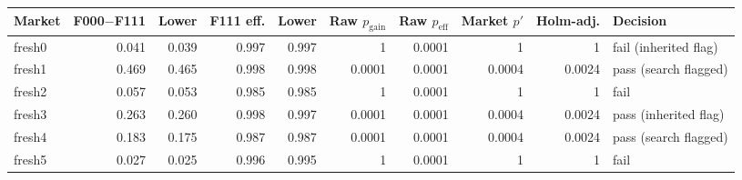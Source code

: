 \begin{tabular}{@{}lrrrrrrrrl@{}}\toprule
Market & F000$-$F111 & Lower & F111 eff. & Lower & Raw $p_{\mathrm{gain}}$ & Raw $p_{\mathrm{eff}}$ & Market $p'$ & Holm-adj. & Decision \\\midrule
fresh0 & 0.041 & 0.039 & 0.997 & 0.997 & 1 & 0.0001 & 1 & 1 & fail (inherited flag) \\
fresh1 & 0.469 & 0.465 & 0.998 & 0.998 & 0.0001 & 0.0001 & 0.0004 & 0.0024 & pass (search flagged) \\
fresh2 & 0.057 & 0.053 & 0.985 & 0.985 & 1 & 0.0001 & 1 & 1 & fail \\
fresh3 & 0.263 & 0.260 & 0.998 & 0.997 & 0.0001 & 0.0001 & 0.0004 & 0.0024 & pass (inherited flag) \\
fresh4 & 0.183 & 0.175 & 0.987 & 0.987 & 0.0001 & 0.0001 & 0.0004 & 0.0024 & pass (search flagged) \\
fresh5 & 0.027 & 0.025 & 0.996 & 0.995 & 1 & 0.0001 & 1 & 1 & fail \\
\bottomrule\end{tabular}
